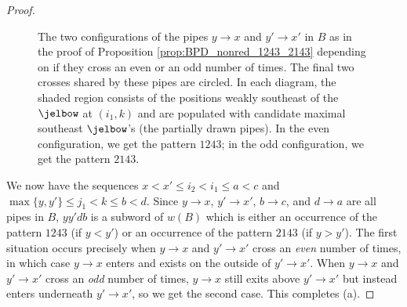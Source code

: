 \begin{proof}
\begin{figure}


    
    \caption{The two configurations of the pipes $y\to x$ and $y'\to x'$ in $B$ as in the proof of Proposition \ref{prop:BPD_nonred_1243_2143} depending on if they cross an even or an odd number of times.
    The final two crosses shared by these pipes are circled.
    In each diagram, the shaded region consists of the positions weakly southeast of the $\protect\jelbow$ at $(i_1,k)$ and are populated with candidate maximal southeast $\protect\jelbow$'s (the partially drawn pipes).
    In the even configuration, we get the pattern $1243$; in the odd configuration, we get the pattern $2143$.}
    \label{fig:1243_diagram}
\end{figure}

    We now have the sequences
    $x < x'\leq i_2 < i_1 \leq a < c$ and
    $\max\{y, y'\} \leq j_1 < k \leq b < d$.
    Since $y\to x$, $y'\to x'$, $b\to c$, and $d\to a$ are all pipes in $B$, $yy'db$ is a subword of $w(B)$ which is either an occurrence of the pattern $1243$ (if $y<y'$) or an occurrence of the pattern $2143$ (if $y>y'$).
    The first situation occurs precisely when $y\to x$ and $y'\to x'$ cross an \textit{even} number of times, in which case $y\to x$ enters and exists on the outside of $y'\to x'$.
    When $y\to x$ and $y'\to x'$ cross an \textit{odd} number of times, $y\to x$ still exits above $y'\to x'$ but instead enters underneath $y'\to x'$, so we get the second case.
    This completes (a).


\end{proof}
